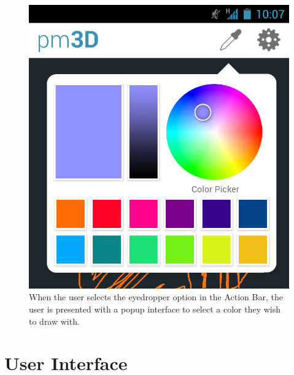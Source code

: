 \documentclass{chi-ext}
\begin{document}
\begin{figure}
\hspace{\columnwidth}%
\parbox{\columnwidth}{
  \centering
  \includegraphics[width=\columnwidth]{colorpicker.jpg}
  \caption{When the user selects the eyedropper option in the Action Bar, the user is presented with a popup interface to select a color they wish to draw with.}
  \label{fig:colorpicker}
}
\end{figure}


\section{User Interface}
\end{document}
